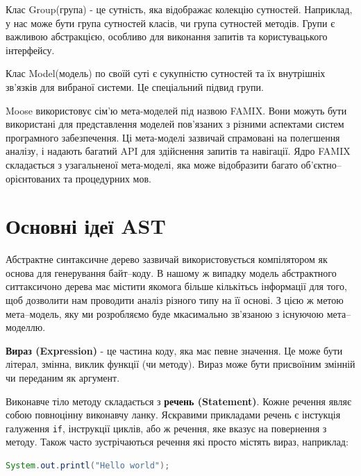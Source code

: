 \documentclass[12pt,a4paper]{article}
\begin{document}
Клас Group(група) - це сутність, яка відображає колекцію сутностей. Наприклад, у нас може бути група сутностей класів, чи група сутностей методів. Групи є важливою абстракцією, особливо для виконання запитів та користувацького інтерфейсу.

Клас Model(модель) по своїй суті є сукупністю сутностей та їх внутрішніх зв'язків для вибраної системи. Це спеціальний підвид групи.

Moose використовує сім'ю мета-моделей під назвою FAMIX. Вони можуть бути використані для представлення моделей пов'язаних з різними аспектами систем програмного забезпечення. Ці мета-моделі зазвичай спрамовані на полегшення аналізу,  і надають багатий API для здійснення запитів та навігації. Ядро FAMIX складається з узагальненої мета-моделі, яка може відобразити багато об'єктно--орієнтованих та процедурних мов. 

\clearpage

\section{Основні ідеї AST}



Абстрактне синтаксичне дерево зазвичай використовується компілятором як основа для генерування байт--коду. В нашому ж випадку модель абстрактного ситтаксичоно дерева має містити якомога більше кількітьсь інформації для того, щоб дозволити нам проводити аналіз різного типу на її основі. З цією ж метою мета--модель, яку ми розробляємо буде мкасимально зв'язаною з існуючою мета--моделлю.

\textbf{Вираз (Expression)} - це частина коду, яка має певне значення. Це може бути літерал, змінна, виклик функції (чи методу). Вираз може бути присвоїним змінній чи переданим як аргумент.

Виконавче тіло методу складається з \textbf{речень (Statement)}. Кожне речення являє собою повноцінну виконавчу ланку. Яскравими прикладами речень є інстукція галуження \lstinline$if$, інструкції циклів, або ж речення, яке вказує на повернення з методу. Також часто зустрічаються речення які просто містять вираз, наприклад:
\begin{lstlisting}[language=Java]
System.out.printl("Hello world");
\end{lstlisting}
\end{document}
